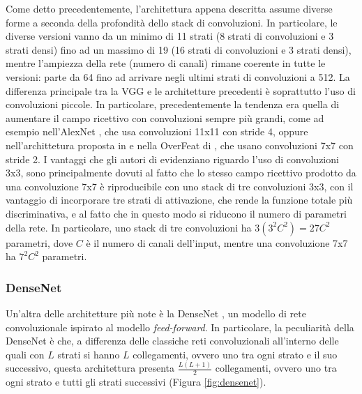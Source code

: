 Come detto precedentemente, l'architettura appena descritta assume diverse forme a seconda della profondità dello stack di convoluzioni. In particolare, le diverse versioni vanno da un minimo di 11 strati (8 strati di convoluzioni e 3 strati densi) fino ad un massimo di 19 (16 strati di convoluzioni e 3 strati densi), mentre l'ampiezza della rete (numero di canali) rimane coerente in tutte le versioni: parte da 64 fino ad arrivare negli ultimi strati di convoluzioni a 512.
La differenza principale tra la VGG e le architetture precedenti è soprattutto l'uso di convoluzioni piccole. In particolare, precedentemente la tendenza era quella di aumentare il campo ricettivo con convoluzioni sempre più grandi, come ad esempio nell'AlexNet \cite{alexnet}, che usa convoluzioni 11x11 con stride 4, oppure nell'archittetura proposta in \cite{visualizing_cnns} e nella OverFeat di \cite{overfeat}, che usano convoluzioni 7x7 con stride 2.
I vantaggi che gli autori di \cite{vgg} evidenziano riguardo l'uso di convoluzioni 3x3, sono principalmente dovuti al fatto che lo stesso campo ricettivo prodotto da una convoluzione 7x7 è riproducibile con uno stack di tre convoluzioni 3x3, con il vantaggio di incorporare tre strati di attivazione, che rende la funzione totale più discriminativa, e al fatto che in questo modo si riducono il numero di parametri della rete. In particolare, uno stack di tre convoluzioni ha $3(3^{2}C^{2})=27C^{2}$ parametri, dove $C$ è il numero di canali dell'input, mentre una convoluzione 7x7 ha $7^{2}C^{2}$ parametri.






\subsubsection{DenseNet}
Un'altra delle architetture più note è la DenseNet \cite{densenet}, un modello di rete convoluzionale ispirato al modello \textit{feed-forward}. In particolare, la peculiarità della DenseNet è che, a differenza delle classiche reti convoluzionali all'interno delle quali con $L$ strati si hanno $L$ collegamenti, ovvero uno tra ogni strato e il suo successivo, questa architettura  presenta $\frac{L(L+1)}{2}$ collegamenti, ovvero uno tra ogni strato e tutti gli strati successivi (Figura \ref{fig:densenet}).


